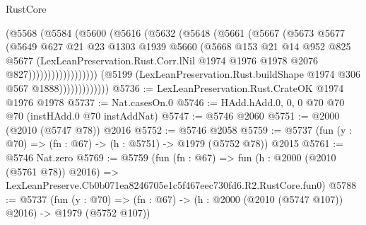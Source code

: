 \begin{lexlean}{RustCore}
\begin{coremodule}
                                      (@5568
                                        (@5584
                                          (@5600
                                            (@5616
                                              (@5632
                                                (@5648
                                                  (@5661
                                                    (@5667
                                                      (@5673
                                                        @5677
                                                        (@5649
                                                          @627
                                                          @21
                                                          @23
                                                          @1303
                                                          @1939
                                                          @5660
                                                          (@5668
                                                            @153
                                                            @21
                                                            @14
                                                            @952
                                                            @825
                                                            @5677
                                                            (LexLeanPreservation.Rust.Corr.lNil
                                                              @1974
                                                              @1976
                                                              @1978
                                                              @2076
                                                              @827))))))))))))))))))
                          (@5199
                            (LexLeanPreservation.Rust.buildShape @1974 @306 @567 @1888)))))))))))))
@5736 := LexLeanPreservation.Rust.CrateOK @1974 @1976 @1978
@5737 := Nat.casesOn.{0}
@5746 := HAdd.hAdd.{0, 0, 0} @70 @70 @70 (instHAdd.{0} @70 instAddNat)
@5747 := @5746 @2060
@5751 := @2000 (@2010 (@5747 @78)) @2016
@5752 := @5746 @2058
@5759 := @5737 (fun (y : @70) => (fn : @67) -> (h : @5751) -> @1979 (@5752 @78)) @2015
@5761 := @5746 Nat.zero
@5769 := @5759
    (fun (fn : @67) =>
    fun (h : @2000 (@2010 (@5761 @78)) @2016) =>
    LexLeanPreserve.Cb0b071ea8246705e1c5f467eec730fd6.R2.RustCore.fun0)
@5788 := @5737
    (fun (y : @70) => (fn : @67) -> (h : @2000 (@2010 (@5747 @107)) @2016) -> @1979 (@5752 @107))

\end{coremodule}
\end{lexlean}
